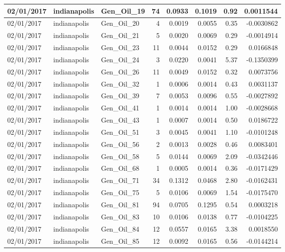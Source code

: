 \documentclass[
  letterpaper,
  DIV=11,
  numbers=noendperiod]{scrartcl}
\begin{document}
\begin{tabular}{l|l|l|r|r|r|r|r}
\hline
02/01/2017 & indianapolis & Gen\_Oil\_19 & 74 & 0.0933 & 0.1019 & 0.92 & 0.0011544\\
\hline
02/01/2017 & indianapolis & Gen\_Oil\_20 & 4 & 0.0019 & 0.0055 & 0.35 & -0.0030862\\
\hline
02/01/2017 & indianapolis & Gen\_Oil\_21 & 5 & 0.0020 & 0.0069 & 0.29 & -0.0014914\\
\hline
02/01/2017 & indianapolis & Gen\_Oil\_23 & 11 & 0.0044 & 0.0152 & 0.29 & 0.0166848\\
\hline
02/01/2017 & indianapolis & Gen\_Oil\_24 & 3 & 0.0220 & 0.0041 & 5.37 & -0.1350399\\
\hline
02/01/2017 & indianapolis & Gen\_Oil\_26 & 11 & 0.0049 & 0.0152 & 0.32 & 0.0073756\\
\hline
02/01/2017 & indianapolis & Gen\_Oil\_32 & 1 & 0.0006 & 0.0014 & 0.43 & 0.0031137\\
\hline
02/01/2017 & indianapolis & Gen\_Oil\_39 & 7 & 0.0053 & 0.0096 & 0.55 & -0.0027892\\
\hline
02/01/2017 & indianapolis & Gen\_Oil\_41 & 1 & 0.0014 & 0.0014 & 1.00 & -0.0028668\\
\hline
02/01/2017 & indianapolis & Gen\_Oil\_43 & 1 & 0.0007 & 0.0014 & 0.50 & 0.0186722\\
\hline
02/01/2017 & indianapolis & Gen\_Oil\_51 & 3 & 0.0045 & 0.0041 & 1.10 & -0.0101248\\
\hline
02/01/2017 & indianapolis & Gen\_Oil\_56 & 2 & 0.0013 & 0.0028 & 0.46 & 0.0083401\\
\hline
02/01/2017 & indianapolis & Gen\_Oil\_58 & 5 & 0.0144 & 0.0069 & 2.09 & -0.0342446\\
\hline
02/01/2017 & indianapolis & Gen\_Oil\_68 & 1 & 0.0005 & 0.0014 & 0.36 & -0.0171429\\
\hline
02/01/2017 & indianapolis & Gen\_Oil\_71 & 34 & 0.1312 & 0.0468 & 2.80 & -0.0162431\\
\hline
02/01/2017 & indianapolis & Gen\_Oil\_75 & 5 & 0.0106 & 0.0069 & 1.54 & -0.0175470\\
\hline
02/01/2017 & indianapolis & Gen\_Oil\_81 & 94 & 0.0705 & 0.1295 & 0.54 & 0.0003218\\
\hline
02/01/2017 & indianapolis & Gen\_Oil\_83 & 10 & 0.0106 & 0.0138 & 0.77 & -0.0104225\\
\hline
02/01/2017 & indianapolis & Gen\_Oil\_84 & 12 & 0.0557 & 0.0165 & 3.38 & 0.0018550\\
\hline
02/01/2017 & indianapolis & Gen\_Oil\_85 & 12 & 0.0092 & 0.0165 & 0.56 & -0.0144214\\

\end{tabular}
\end{document}
